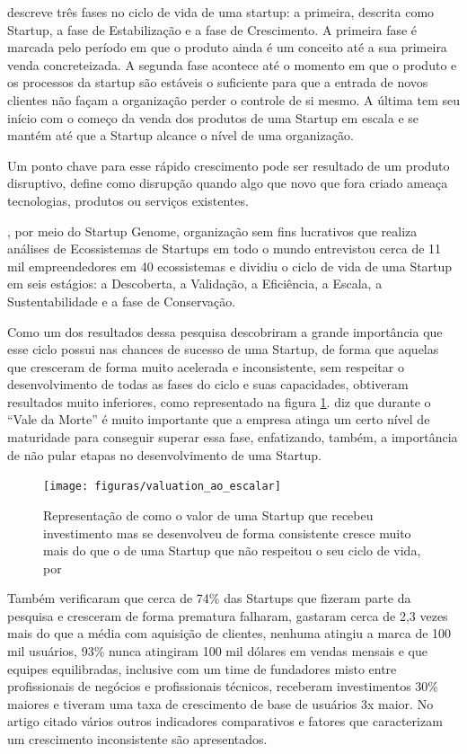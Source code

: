  descreve três fases no ciclo de vida de uma startup: a primeira, descrita como Startup, a fase de Estabilização e a fase de Crescimento.  A primeira fase é marcada pelo período em que o produto ainda é um conceito até a sua primeira venda concreteizada. A segunda fase acontece até o momento em que o produto e os processos da startup são estáveis o suficiente para que a entrada de novos clientes não façam a organização perder o controle de si mesmo. A última tem seu início com o começo da venda dos produtos de uma Startup em escala e se mantém até que a Startup alcance o nível de uma organização.

Um ponto chave para esse rápido crescimento pode ser resultado de um produto disruptivo,  define como disrupção quando algo que novo que fora criado ameaça tecnologias, produtos ou serviços existentes. 

, por meio do Startup Genome, organização sem fins lucrativos que realiza análises de Ecossistemas de Startups em todo o mundo entrevistou cerca de 11 mil empreendedores em 40 ecossistemas e dividiu o ciclo de vida de uma Startup em seis estágios: a Descoberta, a Validação, a Eficiência, a Escala, a Sustentabilidade e a fase de Conservação. 

Como um dos resultados dessa pesquisa descobriram a grande importância que esse ciclo possui nas chances de sucesso de uma Startup, de forma que aquelas que cresceram de forma muito acelerada e inconsistente, sem respeitar o desenvolvimento de todas as fases do ciclo e suas capacidades, obtiveram resultados muito inferiores, como representado na figura \ref{figure:valuation_ao_escalar}.  diz que durante o ``Vale da Morte'' é muito importante que a empresa atinga um certo nível de maturidade para conseguir superar essa fase, enfatizando, também, a importância de não pular etapas no desenvolvimento de uma Startup.

\begin{figure}[!htb]
\centering
\texttt{[image: figuras/valuation\_ao\_escalar]}
\caption{Representação de como o valor de uma Startup que recebeu investimento mas se desenvolveu de forma consistente cresce muito mais do que o de uma Startup que não respeitou o seu ciclo de vida, por \cite{marmer2011startup}}
\label{figure:valuation_ao_escalar}
\end{figure}

Também verificaram que cerca de 74\% das Startups que fizeram parte da pesquisa e cresceram de forma prematura falharam, gastaram cerca de 2,3 vezes mais do que a média com aquisição de clientes, nenhuma atingiu a marca de 100 mil usuários, 93\% nunca atingiram 100 mil dólares em vendas mensais e que equipes equilibradas, inclusive com um time de fundadores misto entre profissionais de negócios e profissionais técnicos, receberam investimentos 30\% maiores e tiveram uma taxa de crescimento de base de usuários 3x maior. No artigo citado vários outros indicadores comparativos e fatores que caracterizam um crescimento inconsistente são apresentados. 

